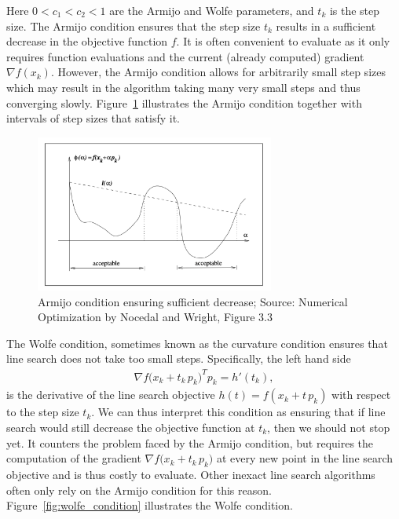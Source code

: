 \documentclass{article}
\begin{document}
Here $0 < c_1 < c_2 < 1$ are the Armijo and Wolfe parameters,
and $t_k$ is the step size.
The Armijo condition ensures that the step size $t_k$ results in
a sufficient decrease in the objective function $f$.
It is often convenient to evaluate as it only requires function
evaluations and the current (already computed) gradient $\nabla f(x_k)$.
However, the Armijo condition allows for arbitrarily small step sizes
which may result in the algorithm taking many very small steps
and thus converging slowly.
Figure~\ref{fig:armijo_condition} illustrates the Armijo condition
together with intervals of step sizes that satisfy it.

\begin{figure}
    \centering
    \includegraphics[width=0.7\textwidth]{plots/armijo_condition.png}
    \caption{Armijo condition ensuring sufficient decrease;
        Source: Numerical Optimization by Nocedal and Wright,
        Figure 3.3
    }
    \label{fig:armijo_condition}
\end{figure}

The Wolfe condition, sometimes known as the curvature condition
ensures that line search does not take too small steps.
Specifically, the left hand side
\begin{align*}
    \nabla f\bigl(x_k + t_k\,p_k\bigr)^T p_k
    = h'(t_k),
\end{align*}
is the derivative of the line search objective
$h(t) = f(x_k + t\,p_k)$
with respect to the step size $t_k$.
We can thus interpret this condition as ensuring that if
line search would still decrease the objective function
at $t_k$, then we should not stop yet.
It counters the problem faced by the Armijo condition,
but requires the computation of the gradient
$\nabla f\bigl(x_k + t_k\,p_k\bigr)$
at every new
point in the line search objective and is thus
costly to evaluate.
Other inexact line search algorithms often only rely on the
Armijo condition for this reason.
Figure~\ref{fig:wolfe_condition} illustrates the Wolfe condition.
\end{document}

